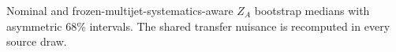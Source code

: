 Nominal and frozen-multijet-systematics-aware $Z_A$ bootstrap medians with asymmetric 68\% intervals. The shared transfer nuisance is recomputed in every source draw.
